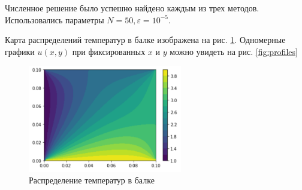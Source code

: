 \documentclass[report , a4paper, onecolumn, 12pt]{article}
\begin{document}
Численное решение было успешно найдено каждым из трех методов. Использовались параметры \hbox{$N = 50, \varepsilon = 10^{-5}$}. 

Карта распределений температур в балке изображена на рис. \ref{fig:heatmap}. Одномерные графики $u(x, y)$ при фиксированных $x$ и $y$ можно увидеть на рис. \ref{fig:profiles}

\begin{figure}[]
    \centering
    \includegraphics[width=0.6\textwidth]{heatmap}
    \caption{Распределение температур в балке}
    \label{fig:heatmap}
\end{figure}
\end{document}
